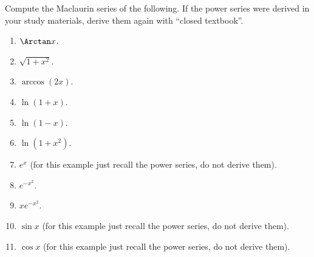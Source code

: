 Compute the Maclaurin series of the following. If the power series were derived in your study materials, derive them again with ``closed textbook''. 
\begin{enumerate}
\item $\displaystyle \Arctan x $.
\item $\sqrt{1+x^2}$.
\item $\arccos (2x)$.
\item $\displaystyle \ln (1+x)$.
\item $\displaystyle \ln (1-x)$.
\item $\ln (1+x^2)$.
\item $e^x$ (for this example just recall the power series, do not derive them).
\item $e^{-x^2}$.
\item $xe^{-x^2}$.
\item $\sin x$ (for this example just recall the power series, do not derive them).
\item $\cos x$ (for this example just recall the power series, do not derive them).
\end{enumerate}

